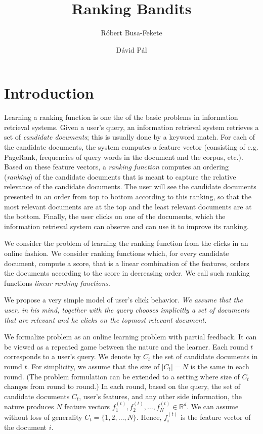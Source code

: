 \documentclass{article}
\newcommand{\R}{\mathbb{R}}
\begin{document}
\title{Ranking Bandits}
\author{R\'obert Busa-Fekete \and D\'avid P\'al}
\maketitle

\section{Introduction}

Learning a ranking function is one the of the basic problems in information
retrieval systems. Given a user's query, an information retrieval system
retrieves a set of \emph{candidate documents}; this is usually done by a keyword
match. For each of the candidate documents, the system computes a feature vector
(consisting of e.g. PageRank, frequencies of query words in the document and the
corpus, etc.). Based on these feature vectors, a \emph{ranking function}
computes an ordering (\emph{ranking}) of the candidate documents that is meant
to capture the relative relevance of the candidate documents. The user will see
the candidate documents presented in an order from top to bottom according to
this ranking, so that the most relevant documents are at the top and the least
relevant documents are at the bottom. Finally, the user clicks on one of the
documents, which the information retrieval system can observe and
can use it to improve its ranking.

We consider the problem of learning the ranking function from the clicks in
an online fashion. We consider ranking functions which, for every candidate
document, compute a score, that is a linear combination of the features, orders
the documents according to the score in decreasing order. We call such ranking
functions \emph{linear ranking functions}.

We propose a very simple model of user's click behavior. \emph{We assume that the
user, in his mind, together with the query chooses implicitly a set of documents
that are relevant and he clicks on the topmost relevant document.}

We formalize problem as an online learning problem with partial feedback. It can
be viewed as a repeated game between the nature and the learner. Each round $t$
corresponds to a user's query. We denote by $C_t$ the set of candidate documents
in round $t$. For simplicity, we assume that the size of $|C_t| = N$ is the same
in each round. (The problem formulation can be extended to a setting where size
of $C_t$ changes from round to round.) In each round, based on the query, the
set of candidate documents $C_t$, user's features, and any other side
information, the nature produces $N$ feature vectors $f_1^{(t)}, f_2^{(t)},
\dots, f_N^{(t)} \in \R^d$. We can assume without loss of generality $C_t =
\{1,2,\dots,N\}$. Hence, $f_i^{(t)}$ is the feature vector of the document $i$.
\end{document}
